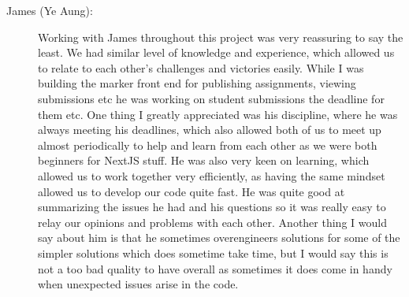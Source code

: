 \documentclass[a4paper, 12pt]{article}
\begin{document}
\begin{enumerate}
\begin{description}
            \item[James (Ye Aung): ] Working with James throughout this project was very reassuring to say the least. We had similar level of knowledge and experience, which allowed us to relate to each other’s challenges and victories easily. While I was building the marker front end for publishing assignments, viewing submissions etc he was working on student submissions the deadline for them etc. One thing I greatly appreciated was his discipline, where he was always meeting his deadlines, which also allowed both of us to meet up almost periodically to help and learn from each other as we were both beginners for NextJS stuff. He was also very keen on learning, which allowed us to work together very efficiently, as having the same mindset allowed us to develop our code quite fast. He was quite good at summarizing the issues he had and his questions so it was really easy to relay our opinions and problems with each other. Another thing I would say about him is that he sometimes overengineers solutions for some of the simpler solutions which does sometime take time, but I would say this is not a too bad quality to have overall as sometimes it does come in handy when unexpected issues arise in the code.
        \end{description}
\end{enumerate}
\end{document}

